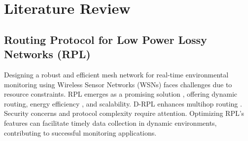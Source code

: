 \section{Literature Review}\label{sec:lr}

\subsection{Routing Protocol for Low Power Lossy Networks (RPL)}\label{sec:lr_rpl}

Designing a robust and efficient mesh network for real-time environmental monitoring using Wireless Sensor Networks (WSNs) faces challenges due to resource constraints. RPL emerges as a promising solution \cite{rechache_study_2021, alexander_rpl_2012, Kharrufa2019RPL-Based}, offering dynamic routing, energy efficiency \cite{info8040124}, and scalability. D-RPL enhances multihop routing \cite{kharrufa_dynamic_2017}. Security concerns \cite{arena_evaluating_2020, mayzaud_distributed_2017, 8998289} and protocol complexity \cite{kharrufa_dynamic_2017} require attention. Optimizing RPL's features can facilitate timely data collection in dynamic environments, contributing to successful monitoring applications.





